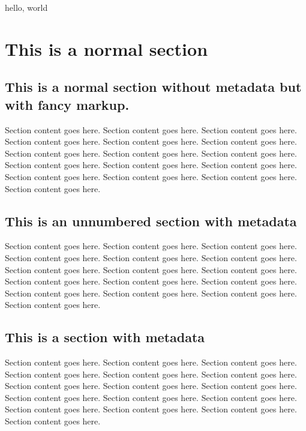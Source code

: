 \documentclass{amsart}
\begin{document}
hello, world

\section{This is a normal section}

\begin{sectionWithMetadata}
\section{This is a normal section without metadata but with fancy markup.}
\end{sectionWithMetadata}

Section content goes here.  Section content goes here.  Section
content goes here.  Section content goes here.  Section content goes
here.  Section content goes here.  Section content goes here.  Section
content goes here.  Section content goes here.  Section content goes
here.  Section content goes here.  Section content goes here.  Section
content goes here.  Section content goes here.  Section content goes
here.  Section content goes here.

\begin{sectionWithMetadata}
\section*{This is an unnumbered section with metadata}
\author{David M. Jones}
\end{sectionWithMetadata}

Section content goes here.  Section content goes here.  Section
content goes here.  Section content goes here.  Section content goes
here.  Section content goes here.  Section content goes here.  Section
content goes here.  Section content goes here.  Section content goes
here.  Section content goes here.  Section content goes here.  Section
content goes here.  Section content goes here.  Section content goes
here.  Section content goes here.

\begin{sectionWithMetadata}
\section{This is a section with metadata}
\author{David M. Jones}
\end{sectionWithMetadata}

Section content goes here.  Section content goes here.  Section
content goes here.  Section content goes here.  Section content goes
here.  Section content goes here.  Section content goes here.  Section
content goes here.  Section content goes here.  Section content goes
here.  Section content goes here.  Section content goes here.  Section
content goes here.  Section content goes here.  Section content goes
here.  Section content goes here.
\end{document}
